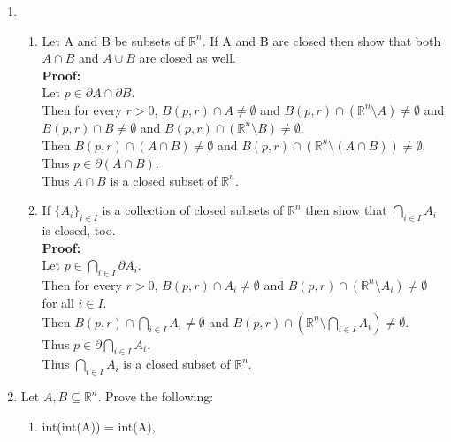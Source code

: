 \documentclass{article}
\begin{document}
\begin{enumerate}
\item %


\begin{enumerate}
    \item  Let A and B be subsets of $\mathbb{R}^n$. If A and B are closed then show that both $A \cap B$ and $A \cup B$ are closed as well.\\ %
    
\textbf{Proof:} \\
Let $p \in \partial A \cap \partial B$. \\
Then for every $r > 0$, $B(p,r) \cap A \neq \emptyset$ and $B(p,r) \cap (\mathbb{R}^n \setminus A) \neq \emptyset$ and $B(p,r) \cap B \neq \emptyset$ and $B(p,r) \cap (\mathbb{R}^n \setminus B) \neq \emptyset$. \\
Then $B(p,r) \cap (A \cap B) \neq \emptyset$ and $B(p,r) \cap (\mathbb{R}^n \setminus (A \cap B)) \neq \emptyset$. \\
Thus $p \in \partial (A \cap B)$. \\
Thus $A \cap B$ is a closed subset of $\mathbb{R}^n$.\\
    \item If $\{A_i\}_{i\in I}$ is a collection of closed subsets of $\mathbb{R}^n$ then show that $\bigcap_{i\in I} A_i$ is closed, too.\\ %

\textbf{Proof:} \\
Let $p \in \bigcap_{i\in I} \partial A_i$. \\
Then for every $r > 0$, $B(p,r) \cap A_i \neq \emptyset$ and $B(p,r) \cap (\mathbb{R}^n \setminus A_i) \neq \emptyset$ for all $i \in I$. \\
Then $B(p,r) \cap \bigcap_{i\in I} A_i \neq \emptyset$ and $B(p,r) \cap (\mathbb{R}^n \setminus \bigcap_{i\in I} A_i) \neq \emptyset$. \\
Thus $p \in \partial \bigcap_{i\in I} A_i$. \\
Thus $\bigcap_{i\in I} A_i$ is a closed subset of $\mathbb{R}^n$.\\

    
\end{enumerate} %

    \item Let $A,B \subseteq \mathbb{R}^n$. Prove the following:\\ %
\begin{enumerate}

    \item int(int(A)) = int(A), \\ %


\end{enumerate}
\end{enumerate}
\end{document}
